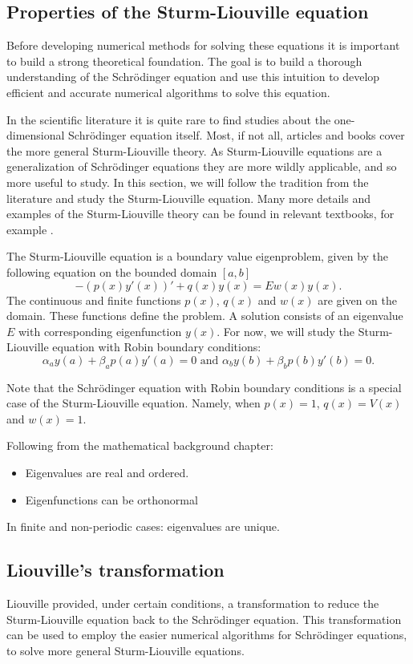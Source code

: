 \subsection{Properties of the Sturm-Liouville equation}

Before developing numerical methods for solving these equations it is important to build a strong theoretical foundation. The goal is to build a thorough understanding of the Schrödinger equation and use this intuition to develop efficient and accurate numerical algorithms to solve this equation.

In the scientific literature it is quite rare to find studies about the one-dimensional Schrödinger equation itself. Most, if not all, articles and books cover the more general Sturm-Liouville theory. As Sturm-Liouville equations are a generalization of Schrödinger equations they are more wildly applicable, and so more useful to study. In this section, we will follow the tradition from the literature and study the Sturm-Liouville equation. Many more details and examples of the Sturm-Liouville theory can be found in relevant textbooks, for example \cite[Chapter~5]{sagan_boundary_1961}.

The Sturm-Liouville equation is a boundary value eigenproblem, given by the following equation on the bounded domain $[a, b]$
$$
    -(p(x) y'(x))' + q(x) y(x) = E w(x) y(x)\text{.}
$$
The continuous and finite functions $p(x)$, $q(x)$ and $w(x)$ are given on the domain. These functions define the problem. A solution consists of an eigenvalue $E$ with corresponding eigenfunction $y(x)$. For now, we will study the Sturm-Liouville equation with Robin boundary conditions:
$$
    \alpha_a y(a) + \beta_a p(a) y'(a) = 0 \text{ and } \alpha_b y(b) + \beta_b p(b) y'(b) = 0\text{.}
$$

Note that the Schrödinger equation with Robin boundary conditions is a special case of the Sturm-Liouville equation. Namely, when $p(x) = 1$, $q(x) = V(x)$ and $w(x) = 1$.

    {\color{red}

        Following from the mathematical background chapter:
        \begin{itemize}
            \item Eigenvalues are real and ordered.
            \item Eigenfunctions can be orthonormal
        \end{itemize}

        In finite and non-periodic cases: eigenvalues are unique.

        \subsection{Liouville's transformation}
        Liouville provided, under certain conditions, a transformation to reduce the Sturm-Liouville equation back to the Schrödinger equation. This transformation can be used to employ the easier numerical algorithms for Schrödinger equations, to solve more general Sturm-Liouville equations.

    }



